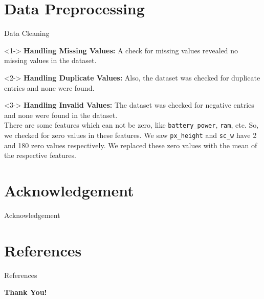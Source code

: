 \documentclass[14pt, aspectratio=169]{beamer}
\begin{document}
\section{Data Preprocessing}
\begin{frame}{Data Cleaning}
  \begin{block}<1->{}
    \textbf{Handling Missing Values:} \small
      A check for missing values revealed no missing values in the dataset.
    \normalsize
  \end{block}
  \begin{block}<2->{}
    \textbf{Handling Duplicate Values:} \small
      Also, the dataset was checked for duplicate entries and none were found.
    \normalsize
  \end{block}
  \begin{block}<3->{}
    \textbf{Handling Invalid Values:} \small
      The dataset was checked for negative entries and none were found in the dataset. \\ 
      There are some features which can not be zero, like \texttt{battery\_power}, \texttt{ram}, etc. So, we checked for zero values in these features. We saw \texttt{px\_height} and \texttt{sc\_w} have 2 and 180 zero values respectively. We replaced these zero values with the mean of the respective features.
    \normalsize
  \end{block}
\end{frame}



\section{Acknowledgement}
\begin{frame}{Acknowledgement}
\end{frame}

\section{References}
\begin{frame}{References}
\end{frame}

\begin{frame}{}
  \Huge
  \centering
  \textbf{Thank You!}
\end{frame}
\end{document}
